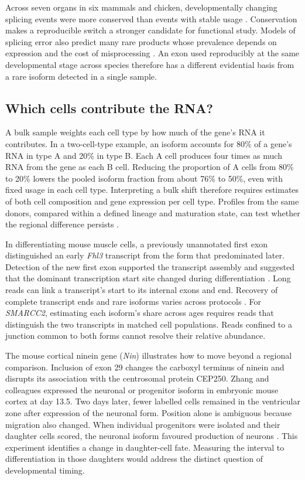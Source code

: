 \documentclass[11pt,a4paper]{article}
\begin{document}
Across seven organs in six mammals and chicken, developmentally changing splicing events were more conserved than events with stable usage \cite{Mazin2021}. Conservation makes a reproducible switch a stronger candidate for functional study. Models of splicing error also predict many rare products whose prevalence depends on expression and the cost of misprocessing \cite{Saudemont2017}. An exon used reproducibly at the same developmental stage across species therefore has a different evidential basis from a rare isoform detected in a single sample.

\subsection{Which cells contribute the RNA?}

A bulk sample weights each cell type by how much of the gene's RNA it contributes. In a two-cell-type example, an isoform accounts for 80\% of a gene's RNA in type A and 20\% in type B. Each A cell produces four times as much RNA from the gene as each B cell. Reducing the proportion of A cells from 80\% to 20\% lowers the pooled isoform fraction from about 76\% to 50\%, even with fixed usage in each cell type. Interpreting a bulk shift therefore requires estimates of both cell composition and gene expression per cell type. Profiles from the same donors, compared within a defined lineage and maturation state, can test whether the regional difference persists \cite{Joglekar2024,Patowary2024}.

In differentiating mouse muscle cells, a previously unannotated first exon distinguished an early \textit{Fhl3} transcript from the form that predominated later. Detection of the new first exon supported the transcript assembly and suggested that the dominant transcription start site changed during differentiation \cite{Trapnell2010}. Long reads can link a transcript's start to its internal exons and end. Recovery of complete transcript ends and rare isoforms varies across protocols \cite{Glinos2022,LRGASP2024}. For \textit{SMARCC2}, estimating each isoform's share across ages requires reads that distinguish the two transcripts in matched cell populations. Reads confined to a junction common to both forms cannot resolve their relative abundance.

The mouse cortical ninein gene (\textit{Nin}) illustrates how to move beyond a regional comparison. Inclusion of exon 29 changes the carboxyl terminus of ninein and disrupts its association with the centrosomal protein CEP250. Zhang and colleagues expressed the neuronal or progenitor isoform in embryonic mouse cortex at day 13.5. Two days later, fewer labelled cells remained in the ventricular zone after expression of the neuronal form. Position alone is ambiguous because migration also changed. When individual progenitors were isolated and their daughter cells scored, the neuronal isoform favoured production of neurons \cite{Zhang2016Nin}. This experiment identifies a change in daughter-cell fate. Measuring the interval to differentiation in those daughters would address the distinct question of developmental timing.
\end{document}

